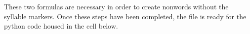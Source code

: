 \documentclass[
12pt, %
english, %
doublespacing, %
nolistspacing, %
liststotoc, %
headsepline, %
chapterinoneline, %
openany, %
]{DoctoralThesis}\usepackage[]{graphicx}\usepackage[]{color}
\begin{document}
These two formulas are necessary in order to create nonwords without the syllable markers. Once these steps have been completed, the file is ready for the python code housed in the cell below.



%

\printbibliography[heading=bibintoc]

\end{document}

